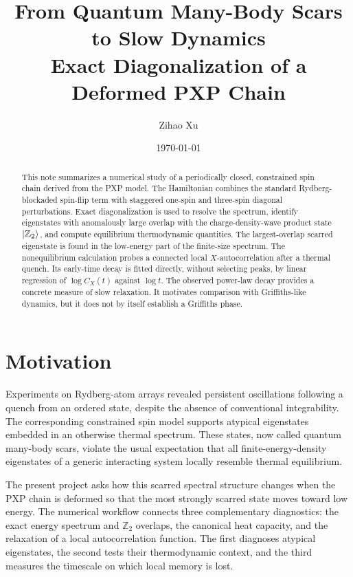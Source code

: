 \documentclass[11pt]{article}
\title{From Quantum Many-Body Scars to Slow Dynamics\\
  \large Exact Diagonalization of a Deformed PXP Chain}
\author{Zihao Xu}
\date{\today}
\newcommand{\Ztwo}{\mathbb{Z}_2}
\begin{document}
\maketitle

\begin{abstract}
This note summarizes a numerical study of a periodically closed, constrained spin
chain derived from the PXP model. The Hamiltonian combines the standard
Rydberg-blockaded spin-flip term with staggered one-spin and three-spin diagonal
perturbations. Exact diagonalization is used to resolve the spectrum, identify
eigenstates with anomalously large overlap with the charge-density-wave product
state $\ket{\Ztwo}$, and compute equilibrium thermodynamic quantities. The
largest-overlap scarred eigenstate is found in the low-energy part of the finite-size
spectrum. The nonequilibrium calculation probes a connected local
$X$-autocorrelation after a thermal quench. Its early-time decay is fitted directly,
without selecting peaks, by linear regression of $\log C_X(t)$ against $\log t$.
The observed power-law decay provides a concrete measure of slow relaxation. It
motivates comparison with Griffiths-like dynamics, but it does not by itself
establish a Griffiths phase.
\end{abstract}

\section{Motivation}

Experiments on Rydberg-atom arrays revealed persistent oscillations following a
quench from an ordered state, despite the absence of conventional integrability.
The corresponding constrained spin model supports atypical
eigenstates embedded in an otherwise thermal spectrum. These states, now called
quantum many-body scars, violate the usual expectation that all finite-energy-density
eigenstates of a generic interacting system locally resemble thermal equilibrium.

The present project asks how this scarred spectral structure changes when the PXP
chain is deformed so that the most strongly scarred state moves toward low energy.
The numerical workflow connects three complementary diagnostics: the exact energy
spectrum and $\Ztwo$ overlaps, the canonical heat capacity, and the relaxation of a
local autocorrelation function. The first diagnoses atypical eigenstates, the second
tests their thermodynamic context, and the third measures the timescale on which local
memory is lost.
\end{document}
